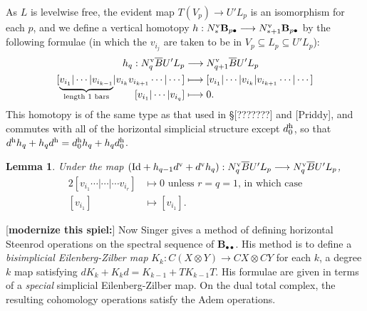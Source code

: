 \documentclass[11pt]{amsart}
\theoremstyle{plain}
\newtheorem{lem}[thm]{Lemma}
\theoremstyle{definition}
\renewcommand{\to}{\longrightarrow}
\theoremstyle{plain}
\newcommand{\UEA}{U'}%
\begin{document}
\begin{appendices}
As $ L$ is levelwise free, the evident map $T(V_p)\to \UEA L_p$ is an isomorphism for each $p$, and we define a vertical homotopy $h:N_*^\textup{v}\textbf{B}_{p\bullet}\to N_{*+1}^\textup{v}\textbf{B}_{p\bullet}$ by the following formulae (in which the $v_{i_{j}}$ are taken to be in $V_p\subseteq  L_p\subseteq\UEA L_p$):
\begin{alignat*}{2}
h_q:N^\textup{v}_q\overline{B}\UEA L_p&\overset{}{\longrightarrow} N^\textup{v}_{q+1}\overline{B}\UEA L_p\\
[\smash{\underbrace{v_{i_1}|\cdots |v_{i_{k-1}}}_{\textup{length 1 bars}}}|v_{i_{k}}v_{i_{k+1}}\cdots |\cdots ]
&\overset{}{\longmapsto}
[v_{i_1}|\cdots |v_{i_{k}}|v_{i_{k+1}}\cdots |\cdots ]%
\\
[v_{i_1}|\cdots |v_{i_{q}}]
&\overset{}{\longmapsto}0.
\end{alignat*}
This homotopy is of the same type as that used in \S[???????] and [Priddy], and commutes with all of the horizontal simplicial structure except $d^\textup{h}_0$, so that $d^\textup{h}h_q+h_qd^\textup{h} =d^\textup{h}_0h_q+h_qd^\textup{h}_0$.
\begin{lem}\label{barConstNullHtpyLemma}
Under the map $(\textup{Id}+h_{q-1}d^\textup{v}+d^\textup{v}h_{q}): N^\textup{v}_q\overline{B}\UEA L_p\to N^\textup{v}_q\overline{B}\UEA L_p$,
\begin{alignat*}{2}
[v_{i_1}\cdots |\cdots |\cdots v_{i_r}]
&\longmapsto0\text{ unless $r=q=1$, in which case}%
\\
[v_{i_1}]
&\longmapsto [v_{i_{1}}].
\end{alignat*}
\end{lem}
[\textbf{modernize this spiel:}] Now Singer \cite{SingerSteen1.pdf} gives a method of defining horizontal Steenrod operations on the spectral sequence of $\textbf{B}_{\bullet\bullet}$. His method is to define a \emph{bisimplicial Eilenberg-Zilber map} $K_k:C\left(X\otimes Y\right)\to CX\otimes CY$ for each $k$, a degree $k$ map satisfying $dK_k+K_kd=K_{k-1}+TK_{k-1}T$. His formulae are given in terms of a \emph{special} simplicial Eilenberg-Zilber map. On the dual total complex, the resulting cohomology operations satisfy the Adem operations.


\end{appendices}
\end{document}
